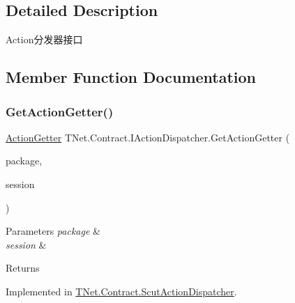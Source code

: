 \subsection{Detailed Description}
Action分发器接口 



\subsection{Member Function Documentation}
\mbox{\label{interface_t_net_1_1_contract_1_1_i_action_dispatcher_a6c8cd6e4355356d71fba54bc53d7a094}} 
\subsubsection{\texorpdfstring{Get\+Action\+Getter()}{GetActionGetter()}}
{\footnotesize\ttfamily \mbox{\hyperlink{class_t_net_1_1_service_1_1_action_getter}{Action\+Getter}} T\+Net.\+Contract.\+I\+Action\+Dispatcher.\+Get\+Action\+Getter (\begin{DoxyParamCaption}\item[{\mbox{\hyperlink{class_t_net_1_1_contract_1_1_request_package}{Request\+Package}}}]{package,  }\item[{\mbox{\hyperlink{class_t_net_1_1_contract_1_1_game_session}{Game\+Session}}}]{session }\end{DoxyParamCaption})}






\begin{DoxyParams}{Parameters}
{\em package} & \\
\hline
{\em session} & \\
\hline
\end{DoxyParams}
\begin{DoxyReturn}{Returns}

\end{DoxyReturn}


Implemented in \mbox{\hyperlink{class_t_net_1_1_contract_1_1_scut_action_dispatcher_adb33996b5f5bf5ad4ebf6ad59fa1f065}{T\+Net.\+Contract.\+Scut\+Action\+Dispatcher}}.

